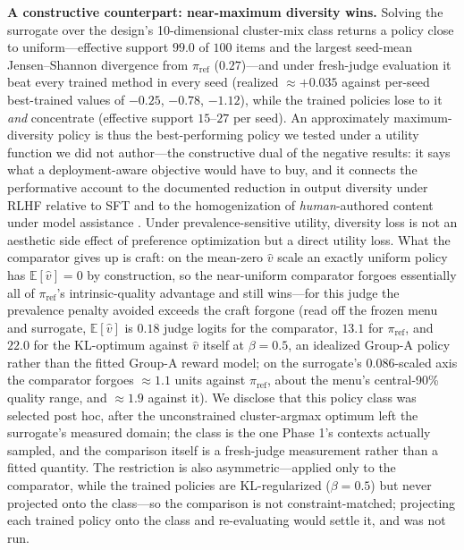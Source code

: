 ﻿\documentclass[11pt]{article}
\begin{document}
\textbf{A constructive counterpart: near-maximum diversity wins.} Solving the surrogate over the design's 10-dimensional cluster-mix class returns a policy close to uniform---effective support \(99.0\) of \(100\) items and the largest seed-mean Jensen--Shannon divergence from \(\pi_{\text{ref}}\) (\(0.27\))---and under fresh-judge evaluation it beat every trained method in every seed (realized \(\approx +0.035\) against per-seed best-trained values of \(-0.25\), \(-0.78\), \(-1.12\)), while the trained policies lose to it \emph{and} concentrate (effective support \(15\)--\(27\) per seed). An approximately maximum-diversity policy is thus the best-performing policy we tested under a utility function we did not author---the constructive dual of the negative results: it says what a deployment-aware objective would have to buy, and it connects the performative account to the documented reduction in output diversity under RLHF relative to SFT \citep{kirk2024} and to the homogenization of \emph{human}-authored content under model assistance \citep{doshi2024, padmakumar2024}. Under prevalence-sensitive utility, diversity loss is not an aesthetic side effect of preference optimization but a direct utility loss. What the comparator gives up is craft: on the mean-zero \(\hat v\) scale an exactly uniform policy has \(\mathbb{E}[\hat v] = 0\) by construction, so the near-uniform comparator forgoes essentially all of \(\pi_{\text{ref}}\)'s intrinsic-quality advantage and still wins---for this judge the prevalence penalty avoided exceeds the craft forgone (read off the frozen menu and surrogate, \(\mathbb{E}[\hat v]\) is \(0.18\) judge logits for the comparator, \(13.1\) for \(\pi_{\text{ref}}\), and \(22.0\) for the KL-optimum against \(\hat v\) itself at \(\beta = 0.5\), an idealized Group-A policy rather than the fitted Group-A reward model; on the surrogate's \(0.086\)-scaled axis the comparator forgoes \(\approx 1.1\) units against \(\pi_{\text{ref}}\), about the menu's central-90\% quality range, and \(\approx 1.9\) against it). We disclose that this policy class was selected post hoc, after the unconstrained cluster-argmax optimum left the surrogate's measured domain; the class is the one Phase 1's contexts actually sampled, and the comparison itself is a fresh-judge measurement rather than a fitted quantity. The restriction is also asymmetric---applied only to the comparator, while the trained policies are KL-regularized (\(\beta = 0.5\)) but never projected onto the class---so the comparison is not constraint-matched; projecting each trained policy onto the class and re-evaluating would settle it, and was not run.
\end{document}
